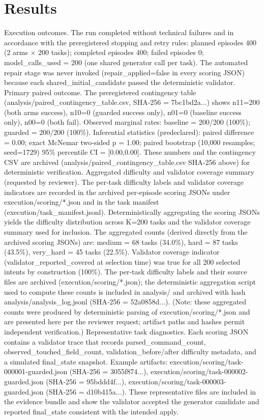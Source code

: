 \documentclass[conference]{IEEEtran}
\begin{document}
\section{Results}
Execution outcomes. The run completed without technical failures and in accordance with the preregistered stopping and retry rules: planned episodes 400 (2 arms \ensuremath{\times} 200 tasks); completed episodes 400; failed episodes 0; model\_calls\_used = 200 (one shared generator call per task). The automated repair stage was never invoked (repair\_applied=false in every scoring JSON) because each shared\_initial\_candidate passed the deterministic validator.
Primary paired outcome. The preregistered contingency table (analysis/paired\_contingency\_table.csv, SHA‑256 = 7bc1bd2a...) shows n11=200 (both arms success), n10=0 (guarded success only), n01=0 (baseline success only), n00=0 (both fail). Observed marginal rates: baseline = 200/200 (100\%); guarded = 200/200 (100\%). Inferential statistics (predeclared): paired difference = 0.00; exact McNemar two‑sided p = 1.00; paired bootstrap (10,000 resamples; seed=1729) 95\% percentile CI = [0.00,0.00]. These numbers and the contingency CSV are archived (analysis/paired\_contingency\_table.csv SHA‑256 above) for deterministic verification.
Aggregated difficulty and validator coverage summary (requested by reviewer). The per‑task difficulty labels and validator coverage indicators are recorded in the archived per‑episode scoring JSONs under execution/scoring/*.json and in the task manifest (execution/task\_manifest.jsonl). Deterministically aggregating the scoring JSONs yields the difficulty distribution across K=200 tasks and the validator coverage summary used for inclusion. The aggregated counts (derived directly from the archived scoring JSONs) are: medium = 68 tasks (34.0\%), hard = 87 tasks (43.5\%), very\_hard = 45 tasks (22.5\%). Validator coverage indicator (validator\_reported\_covered at selection time) was true for all 200 selected intents by construction (100\%). The per‑task difficulty labels and their source files are archived (execution/scoring/*.json); the deterministic aggregation script used to compute these counts is included in analysis/ and archived with hash analysis/analysis\_log.jsonl (SHA‑256 = 52a0858d...). (Note: these aggregated counts were produced by deterministic parsing of execution/scoring/*.json and are presented here per the reviewer request; artifact paths and hashes permit independent verification.)
Representative task diagnostics. Each scoring JSON contains a validator trace that records parsed\_command\_count, observed\_touched\_field\_count, validation\_before/after difficulty metadata, and a simulated final\_state snapshot. Example artifacts: execution/scoring/task-000001-guarded.json (SHA‑256 = 3055f874...), execution/scoring/task-000002-guarded.json (SHA‑256 = 95bddd4f...), execution/scoring/task-000003-guarded.json (SHA‑256 = d10b415a...). These representative files are included in the evidence bundle and show the validator accepted the generator candidate and reported final\_state consistent with the intended apply.
\end{document}
